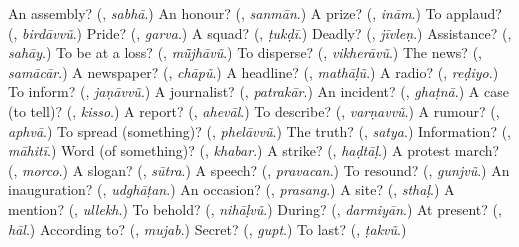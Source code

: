 \begin{tcolorbox}[breakable,colback=teal!4,colframe=teal!35!black,title={Before you move on}]
An assembly? (\textbf{}, \emph{sabhā}.) An honour? (\textbf{}, \emph{sanmān}.) A prize? (\textbf{}, \emph{inām}.) To applaud? (\textbf{}, \emph{birdāvvũ}.) Pride? (\textbf{}, \emph{garva}.) A squad? (\textbf{}, \emph{ṭukḍī}.) Deadly? (\textbf{}, \emph{jīvleṇ}.) Assistance? (\textbf{}, \emph{sahāy}.) To be at a loss? (\textbf{}, \emph{mū̃jhāvũ}.) To disperse? (\textbf{}, \emph{vikherāvũ}.) The news? (\textbf{}, \emph{samācār}.) A newspaper? (\textbf{}, \emph{chāpũ}.) A headline? (\textbf{}, \emph{mathāḷũ}.) A radio? (\textbf{}, \emph{reḍiyo}.) To inform? (\textbf{}, \emph{jaṇāvvũ}.) A journalist? (\textbf{}, \emph{patrakār}.) An incident? (\textbf{}, \emph{ghaṭnā}.) A case (to tell)? (\textbf{}, \emph{kisso}.) A report? (\textbf{}, \emph{ahevāl}.) To describe? (\textbf{}, \emph{varṇavvũ}.) A rumour? (\textbf{}, \emph{aphvā}.) To spread (something)? (\textbf{}, \emph{phelāvvũ}.) The truth? (\textbf{}, \emph{satya}.) Information? (\textbf{}, \emph{māhitī}.) Word (of something)? (\textbf{}, \emph{khabar}.) A strike? (\textbf{}, \emph{haḍtāḷ}.) A protest march? (\textbf{}, \emph{morco}.) A slogan? (\textbf{}, \emph{sūtra}.) A speech? (\textbf{}, \emph{pravacan}.) To resound? (\textbf{}, \emph{gunjvũ}.) An inauguration? (\textbf{}, \emph{udghāṭan}.) An occasion? (\textbf{}, \emph{prasang}.) A site? (\textbf{}, \emph{sthaḷ}.) A mention? (\textbf{}, \emph{ullekh}.) To behold? (\textbf{}, \emph{nihāḷvũ}.) During? (\textbf{}, \emph{darmiyān}.) At present? (\textbf{}, \emph{hāl}.) According to? (\textbf{}, \emph{mujab}.) Secret? (\textbf{}, \emph{gupt}.) To last? (\textbf{}, \emph{ṭakvũ}.)
\end{tcolorbox}
